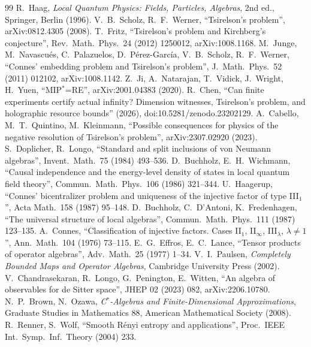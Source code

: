 \documentclass[11pt]{article}
\theoremstyle{definition}\newtheorem{definition}{Definition}[section]
\theoremstyle{remark}\newtheorem*{remark}{Remark}
\begin{document}
\begin{thebibliography}{99}\small
{} R.~Haag, \emph{Local Quantum Physics: Fields, Particles, Algebras}, 2nd ed., Springer, Berlin (1996).
 V.~B.~Scholz, R.~F.~Werner, ``Tsirelson's problem'', arXiv:0812.4305 (2008).
 T.~Fritz, ``Tsirelson's problem and Kirchberg's conjecture'', Rev.\ Math.\ Phys.\ 24 (2012) 1250012, arXiv:1008.1168.
 M.~Junge, M.~Navascu\'es, C.~Palazuelos, D.~P\'erez-Garc\'ia, V.~B.~Scholz, R.~F.~Werner, ``Connes' embedding problem and Tsirelson's problem'', J.\ Math.\ Phys.\ 52 (2011) 012102, arXiv:1008.1142.
 Z.~Ji, A.~Natarajan, T.~Vidick, J.~Wright, H.~Yuen, ``MIP$^*$=RE'', arXiv:2001.04383 (2020).
 R.~Chen, ``Can finite experiments certify actual infinity? Dimension witnesses, Tsirelson's problem, and holographic resource bounds'' (2026), doi:10.5281/zenodo.23202129.
 A.~Cabello, M.~T.~Quintino, M.~Kleinmann, ``Possible consequences for physics of the negative resolution of Tsirelson's problem'', arXiv:2307.02920 (2023).
 S.~Doplicher, R.~Longo, ``Standard and split inclusions of von Neumann algebras'', Invent.\ Math.\ 75 (1984) 493--536.
 D.~Buchholz, E.~H.~Wichmann, ``Causal independence and the energy-level density of states in local quantum field theory'', Commun.\ Math.\ Phys.\ 106 (1986) 321--344.
 U.~Haagerup, ``Connes' bicentralizer problem and uniqueness of the injective factor of type III$_1$'', Acta Math.\ 158 (1987) 95--148.
 D.~Buchholz, C.~D'Antoni, K.~Fredenhagen, ``The universal structure of local algebras'', Commun.\ Math.\ Phys.\ 111 (1987) 123--135.
 A.~Connes, ``Classification of injective factors. Cases II$_1$, II$_\infty$, III$_\lambda$, $\lambda\ne1$'', Ann.\ Math.\ 104 (1976) 73--115.
 E.~G.~Effros, E.~C.~Lance, ``Tensor products of operator algebras'', Adv.\ Math.\ 25 (1977) 1--34.
 V.~I.~Paulsen, \emph{Completely Bounded Maps and Operator Algebras}, Cambridge University Press (2002).
 V.~Chandrasekaran, R.~Longo, G.~Penington, E.~Witten, ``An algebra of observables for de Sitter space'', JHEP 02 (2023) 082, arXiv:2206.10780.
 N.~P.~Brown, N.~Ozawa, \emph{C$^*$-Algebras and Finite-Dimensional Approximations}, Graduate Studies in Mathematics 88, American Mathematical Society (2008).
 R.~Renner, S.~Wolf, ``Smooth R\'enyi entropy and applications'', Proc.\ IEEE Int.\ Symp.\ Inf.\ Theory (2004) 233.

\end{thebibliography}
\end{document}
